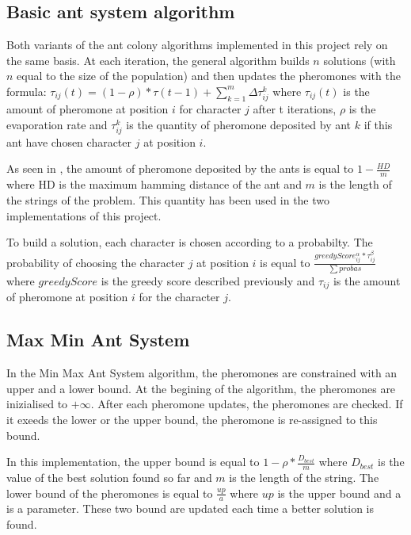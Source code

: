 \documentclass{article}
\begin{document}
\subsection{Basic ant system algorithm}

Both variants of the ant colony algorithms implemented in this project rely on the same basis.
At each iteration, the general algorithm builds $n$ solutions (with $n$ equal to the size of the population) and then updates the pheromones with the formula: $\tau_{ij}(t) = (1-\rho)*\tau(t-1) + \sum \limits_{k=1}^m \Delta \tau_{ij}^k$  where $\tau_{ij}(t)$ is the amount of pheromone at position $i$ for character $j$ after t iterations, $\rho$ is the evaporation rate and $\tau_{ij}^k$ is the quantity of pheromone deposited by ant $k$ if this ant have chosen character $j$ at position $i$. \newline

As seen in \cite{aco_csp}, the amount of pheromone deposited by the ants is equal to $1-\frac{HD}{m}$ where HD is the maximum hamming distance of the ant and $m$ is the length of the strings of the problem.
This quantity has been used in the two implementations of this project. \newline

To build a solution, each character is chosen according to a probabilty.
The probability of choosing the character $j$ at position $i$ is equal to $ \frac{greedyScore_{ij}^{\alpha} * \tau_{ij}^{\beta}}{\sum probas}$ where $greedyScore$ is the greedy score described previously and $\tau_{ij}$ is the amount of pheromone at position $i$ for the character $j$.


\subsection{Max Min Ant System}

In the Min Max Ant System algorithm, the pheromones are constrained with an upper and a lower bound.
At the begining of the algorithm, the pheromones are inizialised to $+\infty$.
After each pheromone updates, the pheromones are checked.
If it exeeds the lower or the upper bound, the pheromone is re-assigned to this bound. \newline

In this implementation, the upper bound is equal to $1-\rho*\frac{D_{best}}{m}$ where $D_{best}$ is the value of the best solution found so far and $m$ is the length of the string.
The lower bound of the pheromones is equal to $\frac{up}{a}$ where $up$ is the upper bound and a is a parameter.
These two bound are updated each time a better solution is found.\newline
\end{document}
